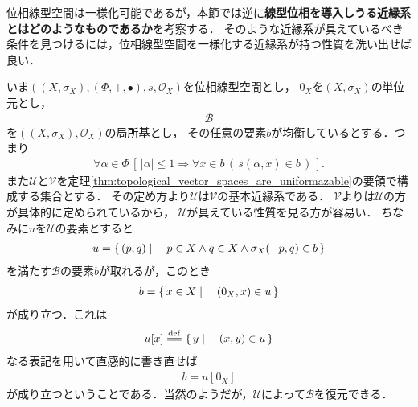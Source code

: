	位相線型空間は一様化可能であるが，本節では逆に{\bf 線型位相を導入しうる近縁系とはどのようなものであるか}を考察する．
	そのような近縁系が具えているべき条件を見つけるには，位相線型空間を一様化する近縁系が持つ性質を洗い出せば良い．
	
	いま$\left(\left(X,\sigma_X\right),(\Phi,+,\bullet),s,\mathscr{O}_X\right)$を位相線型空間とし，
	$0_X$を$\left(X,\sigma_X\right)$の単位元とし，
	\begin{align}
		\mathscr{B}
	\end{align}
	を$\left(\left(X,\sigma_X\right),\mathscr{O}_X\right)$の局所基とし，
	その任意の要素$b$が均衡しているとする．つまり
	\begin{align}
		\forall \alpha \in \Phi\,
		\left[\, |\alpha| \leq 1 \Longrightarrow \forall x \in b\, \left(\, s(\alpha,x) \in b\, \right)\, \right].
	\end{align}
	また$\mathscr{U}$と$\mathscr{V}$を定理\ref{thm:topological_vector_spaces_are_uniformazable}の要領で構成する集合とする．
	その定め方より$\mathscr{U}$は$\mathscr{V}$の基本近縁系である．
	$\mathscr{V}$よりは$\mathscr{U}$の方が具体的に定められているから，
	$\mathscr{U}$が具えている性質を見る方が容易い．
	ちなみに$u$を$\mathscr{U}$の要素とすると
	\begin{align}
		u = \left\{\, (p,q) \mid \quad p \in X \wedge q \in X \wedge \sigma_X(-p,q) \in b\, \right\}
	\end{align}
	を満たす$\mathscr{B}$の要素$b$が取れるが，このとき
	\begin{align}
		b = \left\{\, x \in X \mid \quad \left(0_X,x\right) \in u\, \right\}
	\end{align}
	が成り立つ．これは
	\begin{align}
		u[x] \defeq \Set{y}{(x,y) \in u}
	\end{align}
	なる表記を用いて直感的に書き直せば
	\begin{align}
		b = u[0_X]
	\end{align}
	が成り立つということである．当然のようだが，$\mathscr{U}$によって$\mathscr{B}$を復元できる．
	
